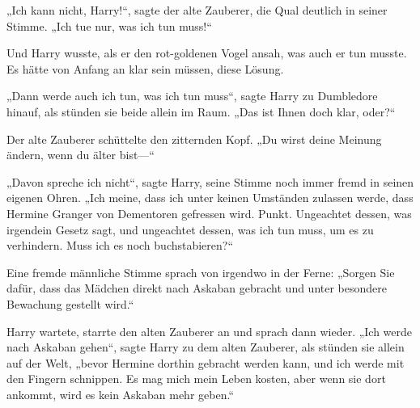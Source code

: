 „Ich kann nicht, Harry!“, sagte der alte Zauberer, die Qual deutlich in seiner Stimme. „Ich tue nur, was ich tun muss!“

Und Harry wusste, als er den rot-goldenen Vogel ansah, was auch er tun musste. Es hätte von Anfang an klar sein müssen, diese Lösung.

„Dann werde auch ich tun, was ich tun muss“, sagte Harry zu Dumbledore hinauf, als stünden sie beide allein im Raum. „Das ist Ihnen doch klar, oder?“

Der alte Zauberer schüttelte den zitternden Kopf. „Du wirst deine Meinung ändern, wenn du älter bist—“

„Davon spreche ich nicht“, sagte Harry, seine Stimme noch immer fremd in seinen eigenen Ohren. „Ich meine, dass ich unter keinen Umständen zulassen werde, dass Hermine Granger von Dementoren gefressen wird. Punkt. Ungeachtet dessen, was irgendein Gesetz sagt, und ungeachtet dessen, was ich tun muss, um es zu verhindern. Muss ich es noch buchstabieren?“

Eine fremde männliche Stimme sprach von irgendwo in der Ferne: „Sorgen Sie dafür, dass das Mädchen direkt nach Askaban gebracht und unter besondere Bewachung gestellt wird.“

Harry wartete, starrte den alten Zauberer an und sprach dann wieder.
„Ich werde nach Askaban gehen“, sagte Harry zu dem alten Zauberer, als stünden sie allein auf der Welt, „bevor Hermine dorthin gebracht werden kann, und ich werde mit den Fingern schnippen. Es mag mich mein Leben kosten, aber wenn sie dort ankommt, wird es kein Askaban mehr geben.“

